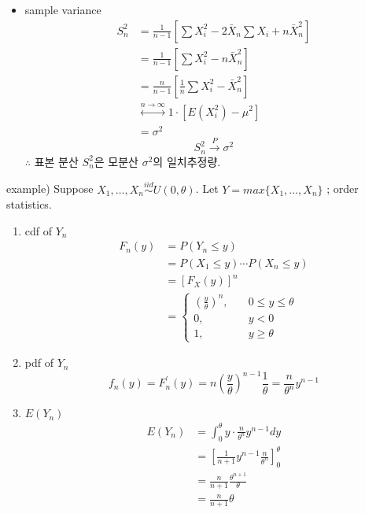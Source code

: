 \documentclass{oblivoir}
\begin{document}
\begin{itemize}
\begin{itemize}
\item sample variance
\begin{align*}
S_n^2 &= \frac{1}{n-1} \left[\sum X_i^2 - 2 \bar{X}_n \sum X_i + n \bar{X}_n^2 \right] \\
&= \frac{1}{n-1} \left[\sum X_i^2 - n \bar{X}_n^2\right] \\
&= \frac{n}{n-1} \left[\frac{1}{n} \sum X_i^2 - \bar{X}_n^2\right] \\
&\overset{n \rightarrow \infty}{\longleftrightarrow} 1 \cdot \left[E(X_i^2) - \mu^2 \right] \\
&= \sigma^2
\end{align*}
$$
S_n^2 \overset{P}{\longrightarrow} \sigma^2
$$
$\therefore$ 표본 분산 $S_n^2$은 모분산 $\sigma^2$의 일치추정량.
\end{itemize}

example) Suppose $X_1, \ldots, X_n \overset{iid}{\sim} U(0, \theta)$. Let $Y = max\{ X_1, \ldots, X_n \}$ ; order statistics.

\begin{enumerate}
\item cdf of $Y_n$
\begin{align*}
F_n(y) &= P(Y_n \leq y) \\
&= P(X_1 \leq y) \cdots P(X_n \leq y) \\
&= \left[F_X(y) \right]^n \\
&= 
\begin{cases}
\left(\frac{y}{\theta} \right)^n, \quad &0 \leq y \leq \theta \\
0, & y < 0 \\
1, & y \geq \theta
\end{cases} 
\end{align*}

\item pdf of $Y_n$
$$
f_n(y) = F_n^{\prime} (y) = n \left( \frac{y}{\theta}\right)^{n-1} \frac{1}{\theta} = \frac{n}{\theta^n} y^{n-1}
$$

\item $E(Y_n)$
\begin{align*}
E(Y_n) &= \int_0^{\theta} y \cdot \frac{n}{\theta^n} y^{n-1} dy \\
&= \left[\frac{1}{n+1} y^{n-1} \frac{n}{\theta^n} \right]_0^{\theta} \\
&= \frac{n}{n+1} \frac{\theta^{n+1}}{\theta} \\
&= \frac{n}{n+1} \theta \\
\end{align*}


\end{enumerate}
\end{itemize}
\end{document}
